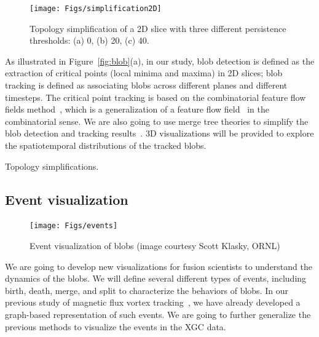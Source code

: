 
\begin{figure}[!h]
  \centering
  \texttt{[image: Figs/simplification2D]}
  \caption{Topology simplification of a 2D slice with three different persistence thresholds: (a) 0, (b) 20, (c) 40.}
\end{figure}


As illustrated in Figure~\ref{fig:blob}(a), in our study, blob detection is defined as the extraction of critical points (local minima and maxima) in 2D slices; blob tracking is defined as associating blobs across different planes and different timesteps.  The critical point tracking is based on the combinatorial feature flow fields method~\cite{ReininghausKWH12}, which is a generalization of a feature flow field~\cite{TheiselS03} in the combinatorial sense.  We are also going to use merge tree theories to simplify the blob detection and tracking results~\cite{OesterlingHWMS17}.  3D visualizations will be provided to explore the spatiotemporal distributions of the tracked blobs.  

Topology simplifications.  




\subsection{Event visualization}

\begin{figure}[!h]
  \centering
  \texttt{[image: Figs/events]}
  \caption{Event visualization of blobs (image courtesy Scott Klasky, ORNL)}
  \label{fig:events}
\end{figure}

We are going to develop new visualizations for fusion scientists to understand the dynamics of the blobs.  We will define several different types of events, including birth, death, merge, and split to characterize the behaviors of blobs.  In our previous study of magnetic flux vortex tracking~\cite{GuoPPKG16, GuoPG17, PhillipsGPKG16, PhillipsPKG15}, we have already developed a graph-based representation of such events.  We are going to further generalize the previous methods to visualize the events in the XGC data.  

% 


% 

